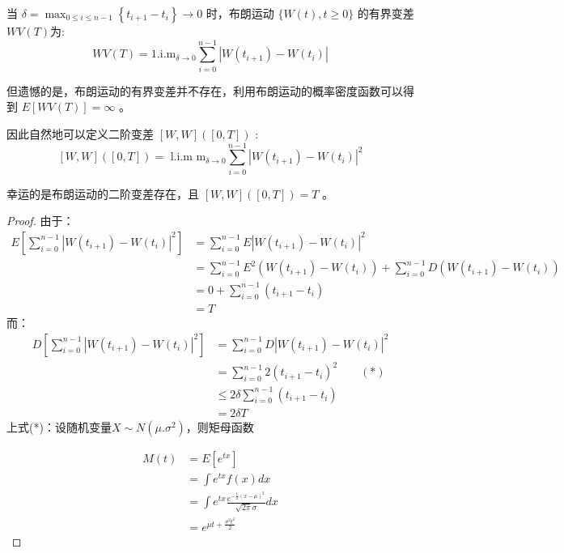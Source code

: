 \documentclass[lang=cn,newtx,10pt,scheme=chinese]{elegantbook}
\begin{document}
当 $\delta=\max _{0 \leq i \leq n-1}\left\{t_{i+1}-t_i\right\} \rightarrow 0$ 时，布朗运动 $\{W(t), t \geq 0\}$ 的有界变差 $W V(T)$为:
$$
W V(T)=1 . \mathrm{i} . \mathrm{m}_{\delta \rightarrow 0} \sum_{i=0}^{n-1}\left|W\left(t_{i+1}\right)-W\left(t_i\right)\right|
$$

但遗憾的是，布朗运动的有界变差并不存在，利用布朗运动的概率密度函数可以得到 $E[W V(T)]=\infty$ 。

因此自然地可以定义二阶变差 $[W, W]([0, T])$ :
$$
[W, W]([0, T])=\text { l.i.m } \mathrm{m}_{\delta \rightarrow 0} \sum_{i=0}^{n-1}\left|W\left(t_{i+1}\right)-W\left(t_i\right)\right|^2
$$

幸运的是布朗运动的二阶变差存在，且 $[W, W]([0, T])=T$ 。
\begin{proof}
  由于：
  \begin{equation}
    \begin{aligned}
      E\left[\sum_{i=0}^{n-1}\left|W\left(t_{i+1}\right)-W\left(t_i\right)\right|^2\right] & =\sum_{i=0}^{n-1} E\left|W\left(t_{i+1}\right)-W\left(t_i\right)\right|^2 \\
      & =\sum_{i=0}^{n-1} E^2\left(W\left(t_{i+1}\right)-W\left(t_i\right)\right)+\sum_{i=0}^{n-1} D\left(W\left(t_{i+1}\right)-W\left(t_i\right)\right) \\
      & =0+\sum_{i=0}^{n-1}\left(t_{i+1}-t_i\right) \\
      & =T
    \end{aligned}
  \end{equation}
  而：
  \begin{equation}
  \begin{aligned}
    D\left[\sum_{i=0}^{n-1}\left|W\left(t_{i+1}\right)-W\left(t_i\right)\right|^2\right] & =\sum_{i=0}^{n-1} D\left|W\left(t_{i+1}\right)-W\left(t_i\right)\right|^2 \\
    & =\sum_{i=0}^{n-1} 2\left(t_{i+1}-t_i\right)^2  \qquad(*)\\
    & \leq 2 \delta \sum_{i=0}^{n-1}\left(t_{i+1}-t_i\right) \\
    & =2 \delta T
  \end{aligned}
\end{equation}
上式(*)：设随机变量$X \sim N(\mu. \sigma^2)$，则矩母函数

$$
\begin{aligned}
M(t) & =E\left[e^{t x}\right] \\
& =\int e^{t x} f(x) d x \\
& =\int e^{t x} \frac{e^{-\frac{1}{2}(x-\mu)^2}}{\sqrt{2 \pi} \sigma} d x \\
& =e^{\mu t+\frac{\sigma^2 t^2}{2}}
\end{aligned}
$$


\end{proof}
\end{document}
